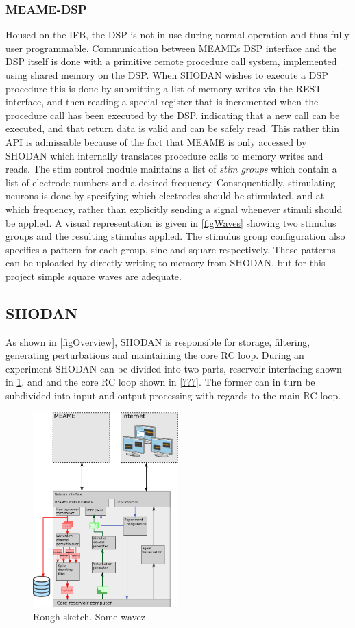 \subsubsection{MEAME-DSP}
Housed on the IFB, the DSP is not in use during normal operation and thus fully
user programmable.
Communication between MEAMEs DSP interface and the DSP itself is done with a
primitive remote procedure call system, implemented using shared memory on the
DSP.
When SHODAN wishes to execute a DSP procedure this is done by submitting a list
of memory writes via the REST interface, and then reading a special register
that is incremented when the procedure call has been executed by the DSP,
indicating that a new call can be executed, and that return data is valid and
can be safely read.
This rather thin API is admissable because of the fact that MEAME is only
accessed by SHODAN which internally translates procedure calls to memory writes
and reads.
The stim control module maintains a list of \emph{stim groups} which contain a
list of electrode numbers and a desired frequency.
Consequentially, stimulating neurons is done by specifying which electrodes
should be stimulated, and at which frequency, rather than explicitly sending a
signal whenever stimuli should be applied.
A visual representation is given in \ref{figWaves} showing two stimulus groups
and the resulting stimulus applied.
The stimulus group configuration also specifies a pattern for each group, sine
and square respectively.
These patterns can be uploaded by directly writing to memory from SHODAN, but
for this project simple square waves are adequate.
\subsection{SHODAN}
As shown in \ref{figOverview}, SHODAN is responsible for storage, filtering,
generating perturbations and maintaining the core RC loop.
During an experiment SHODAN can be divided into two parts, reservoir interfacing
shown in \ref{figSHODANiface}, and and the core RC loop shown in \ref{???}.
The former can in turn be subdivided into input and output processing with
regards to the main RC loop.
\begin{figure}[h!]
  \centering
  \includegraphics[width=0.5\textwidth]{fig/SHODANfrontend.png}
  \caption{Rough sketch.
    Some wavez
  }
  \label{figSHODANiface}
\end{figure}
